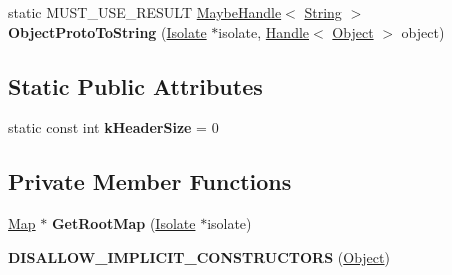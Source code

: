 \begin{DoxyCompactItemize}
\item 
static M\+U\+S\+T\+\_\+\+U\+S\+E\+\_\+\+R\+E\+S\+U\+LT \hyperlink{classv8_1_1internal_1_1_maybe_handle}{Maybe\+Handle}$<$ \hyperlink{classv8_1_1internal_1_1_string}{String} $>$ {\bfseries Object\+Proto\+To\+String} (\hyperlink{classv8_1_1internal_1_1_isolate}{Isolate} $\ast$isolate, \hyperlink{classv8_1_1internal_1_1_handle}{Handle}$<$ \hyperlink{classv8_1_1internal_1_1_object}{Object} $>$ object)\hypertarget{classv8_1_1internal_1_1_object_a5aefab767d6c543f3b111768fcba337f}{}\label{classv8_1_1internal_1_1_object_a5aefab767d6c543f3b111768fcba337f}

\end{DoxyCompactItemize}
\subsection*{Static Public Attributes}
\begin{DoxyCompactItemize}
\item 
static const int {\bfseries k\+Header\+Size} = 0\hypertarget{classv8_1_1internal_1_1_object_ad3351fa81dab11402a320cbc39482151}{}\label{classv8_1_1internal_1_1_object_ad3351fa81dab11402a320cbc39482151}

\end{DoxyCompactItemize}
\subsection*{Private Member Functions}
\begin{DoxyCompactItemize}
\item 
\hyperlink{classv8_1_1internal_1_1_map}{Map} $\ast$ {\bfseries Get\+Root\+Map} (\hyperlink{classv8_1_1internal_1_1_isolate}{Isolate} $\ast$isolate)\hypertarget{classv8_1_1internal_1_1_object_a4d7acb4c0314c590822efd464a652b6f}{}\label{classv8_1_1internal_1_1_object_a4d7acb4c0314c590822efd464a652b6f}

\item 
{\bfseries D\+I\+S\+A\+L\+L\+O\+W\+\_\+\+I\+M\+P\+L\+I\+C\+I\+T\+\_\+\+C\+O\+N\+S\+T\+R\+U\+C\+T\+O\+RS} (\hyperlink{classv8_1_1internal_1_1_object}{Object})\hypertarget{classv8_1_1internal_1_1_object_af3781995347b75df95e78aac98a9d94d}{}\label{classv8_1_1internal_1_1_object_af3781995347b75df95e78aac98a9d94d}

\end{DoxyCompactItemize}
